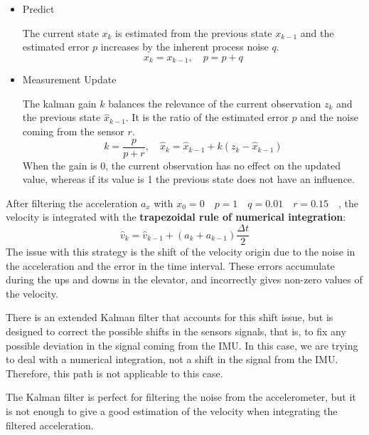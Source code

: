 \begin{itemize}
\begin{itemize}
	\item Predict
	
	The current state $x_{k}$ is estimated from the previous state $x_{k-1}$ and the estimated error $p$ increases by the inherent process noise $q$.\[x_{k}=x_{k-1}, \quad p=p+q\]
	\item Measurement Update
	
	The kalman gain $k$ balances the relevance of the current observation $z_{k}$ and the previous state $\hat{x}_{k-1}$. It is the ratio of the estimated error $p$ and the noise coming from the sensor $r$. \[k=\frac{p}{p+r}, \quad \hat{x}_{k}=\hat{x}_{k-1}+k(z_{k}-\hat{x}_{k-1})\] When the gain is 0, the current observation has no effect on the updated value, whereas if its value is 1 the previous state does not have an influence.

\end{itemize}
\end{itemize}

After filtering the acceleration $a_x$ with $x_{0}=0 \quad p=1\quad q=0.01\quad r=0.15\quad$, the velocity is integrated with the \textbf{trapezoidal rule of numerical integration}: \[\hat{v}_{k}=\hat{v}_{k-1}+(a_{k}+a_{k-1})\frac{\Delta t}{2}\] The issue with this strategy is the shift of the velocity origin due to the noise in the acceleration and the error in the time interval. These errors accumulate during the ups and downs in the elevator, and incorrectly gives non-zero values of the velocity.

There is an extended Kalman filter that accounts for this shift issue, but is designed to correct the possible shifts in the sensors signals, that is, to fix any possible deviation in the signal coming from the IMU. In this case, we are trying to deal with a numerical integration, not a shift in the signal from the IMU. Therefore, this path is not applicable to this case.

The Kalman filter is perfect for filtering the noise from the accelerometer, but it is not enough to give a good estimation of the velocity when integrating the filtered acceleration. 

